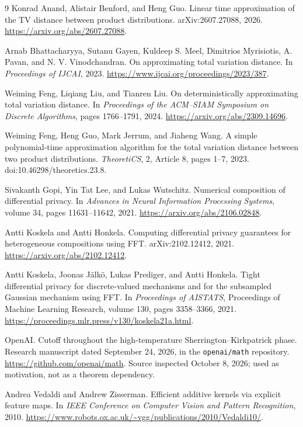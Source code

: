 \documentclass[11pt]{article}
\theoremstyle{definition}
\theoremstyle{remark}
\begin{document}
\begin{thebibliography}{9}
Konrad Anand, Alistair Benford, and Heng Guo.
\newblock Linear time approximation of the TV distance between product distributions.
\newblock arXiv:2607.27088, 2026.
\newblock \url{https://arxiv.org/abs/2607.27088}.

Arnab Bhattacharyya, Sutanu Gayen, Kuldeep S. Meel, Dimitrios Myrisiotis,
A. Pavan, and N. V. Vinodchandran.
\newblock On approximating total variation distance.
\newblock In \emph{Proceedings of IJCAI}, 2023.
\newblock \url{https://www.ijcai.org/proceedings/2023/387}.

Weiming Feng, Liqiang Liu, and Tianren Liu.
\newblock On deterministically approximating total variation distance.
\newblock In \emph{Proceedings of the ACM--SIAM Symposium on Discrete Algorithms},
  pages 1766--1791, 2024.
\newblock \url{https://arxiv.org/abs/2309.14696}.

Weiming Feng, Heng Guo, Mark Jerrum, and Jiaheng Wang.
\newblock A simple polynomial-time approximation algorithm for the total variation distance between two product distributions.
\newblock \emph{TheoretiCS}, 2, Article 8, pages 1--7, 2023.
\newblock doi:10.46298/theoretics.23.8.

Sivakanth Gopi, Yin Tat Lee, and Lukas Wutschitz.
\newblock Numerical composition of differential privacy.
\newblock In \emph{Advances in Neural Information Processing Systems},
  volume 34, pages 11631--11642, 2021.
\newblock \url{https://arxiv.org/abs/2106.02848}.

Antti Koskela and Antti Honkela.
\newblock Computing differential privacy guarantees for heterogeneous compositions using FFT.
\newblock arXiv:2102.12412, 2021.
\newblock \url{https://arxiv.org/abs/2102.12412}.

Antti Koskela, Joonas J{\"a}lk{\"o}, Lukas Prediger, and Antti Honkela.
\newblock Tight differential privacy for discrete-valued mechanisms and for the subsampled Gaussian mechanism using FFT.
\newblock In \emph{Proceedings of AISTATS}, Proceedings of Machine Learning Research,
  volume 130, pages 3358--3366, 2021.
\newblock \url{https://proceedings.mlr.press/v130/koskela21a.html}.

OpenAI.
\newblock Cutoff throughout the high-temperature Sherrington--Kirkpatrick phase.
\newblock Research manuscript dated September 24, 2026, in the \texttt{openai/math} repository.
\newblock \url{https://github.com/openai/math}.
\newblock Source inspected October 8, 2026; used as motivation, not as a theorem dependency.

Andrea Vedaldi and Andrew Zisserman.
\newblock Efficient additive kernels via explicit feature maps.
\newblock In \emph{IEEE Conference on Computer Vision and Pattern Recognition}, 2010.
\newblock \url{https://www.robots.ox.ac.uk/~vgg/publications/2010/Vedaldi10/}.
\end{thebibliography}
\end{document}
